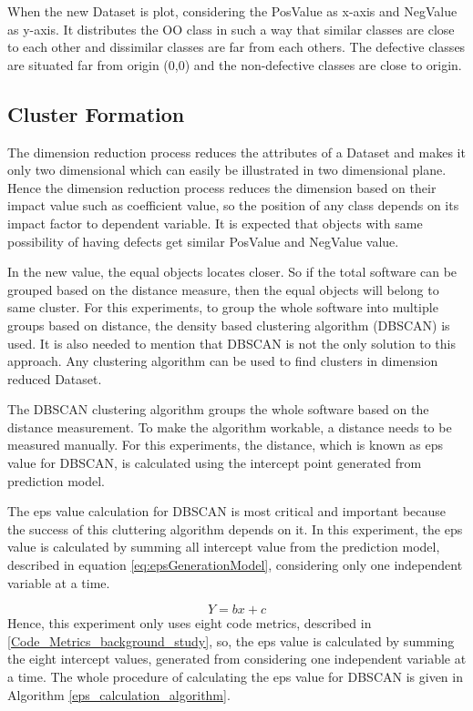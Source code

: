 \documentclass[12pt]{report}
\begin{document}
When the new Dataset is plot, considering the PosValue as x-axis and NegValue as y-axis. It distributes the OO class in such a way that similar classes are close to each other and dissimilar classes are far from each others. The defective classes are situated far from origin (0,0) and the non-defective classes are close to origin.  

\subsection{Cluster Formation}

The dimension reduction process reduces the attributes of a Dataset and makes it only two dimensional which can easily be illustrated in two dimensional plane. Hence the dimension reduction process reduces the dimension based on their impact value such as coefficient value, so the position of any class depends on its impact factor to dependent variable. It is expected that objects with same possibility of having defects get similar PosValue and NegValue value.
 
In the new value, the equal objects locates closer. So if the total software can be grouped based on the distance measure, then the equal objects will belong to same cluster. For this experiments, to group the whole software into multiple groups based on distance, the density based clustering algorithm (DBSCAN) is used. It is also needed to mention that DBSCAN is not the only solution to this approach. Any clustering algorithm can be used to find clusters in dimension reduced Dataset.
 
The DBSCAN clustering algorithm groups the whole software based on the distance measurement. To make the algorithm workable, a distance needs to be measured manually. For this experiments, the distance, which is known as eps value for DBSCAN, is calculated using the intercept point generated from prediction model.

The eps value calculation for DBSCAN is most critical and important because the success of this cluttering algorithm depends on it. In this experiment, the eps value is calculated by summing all intercept value from the prediction model, described in equation \ref{eq:epsGenerationModel}, considering only one independent variable at a time. 

\begin{equation}
\label{eq:epsGenerationModel}
 Y=bx+c
\end{equation}
Hence, this experiment only uses eight code metrics, described in \ref{Code_Metrics_background_study}, so, the eps value is calculated by summing the eight intercept values, generated from considering one independent variable at a time.  
The whole procedure of calculating the eps value for DBSCAN is given in Algorithm \ref{eps_calculation_algorithm}. 
\end{document}
